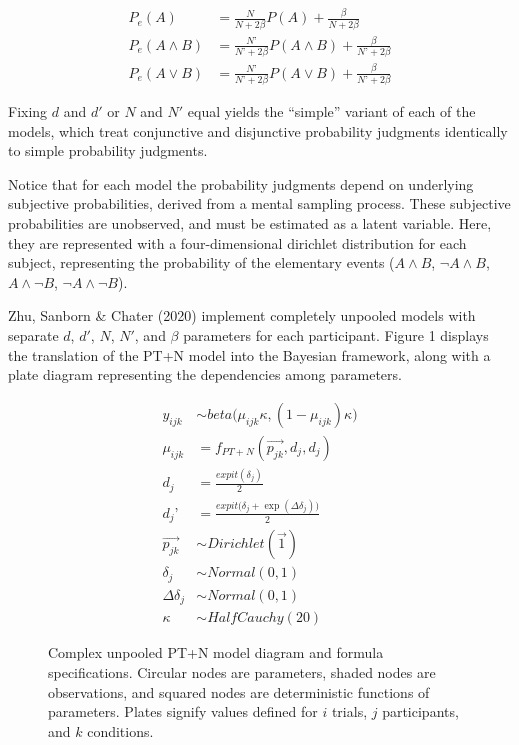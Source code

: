 \documentclass[
  english,
  man,floatsintext]{apa6}
\begin{document}
\begin{align*}
  P_{e}(A) &= \frac{N}{N + 2 \beta}P(A) + \frac{\beta}{N+2 \beta} \\
  P_{e}(A \land B) &= \frac{N’}{N’ + 2 \beta}P(A \land B) + \frac{\beta}{N’+2 \beta} \\
  P_{e}(A \lor B) &= \frac{N’}{N’ + 2 \beta}P(A \lor B) + \frac{\beta}{N’+2 \beta} 
\end{align*}

Fixing \(d\) and \(d'\) or \(N\) and \(N'\) equal yields the ``simple'' variant of each of the models, which treat conjunctive and disjunctive probability judgments identically to simple probability judgments.

Notice that for each model the probability judgments depend on underlying subjective probabilities, derived from a mental sampling process. These subjective probabilities are unobserved, and must be estimated as a latent variable. Here, they are represented with a four-dimensional dirichlet distribution for each subject, representing the probability of the elementary events (\(A \land B\), \(\neg A \land B\), \(A \land \neg B\), \(\neg A \land \neg B\)).

Zhu, Sanborn \& Chater (2020) implement completely unpooled models with separate \(d\), \(d'\), \(N\), \(N'\), and \(\beta\) parameters for each participant. Figure 1 displays the translation of the PT+N model into the Bayesian framework, along with a plate diagram representing the dependencies among parameters.

\begin{figure}
  \begin{minipage}{.5\textwidth}
    \flushright
    
  \end{minipage}%
  \begin{minipage}{.5\textwidth}
    \flushleft
    \small
    \begin{align*}
      y_{ijk} &\sim beta\big(\mu_{ijk} \kappa, (1-\mu_{ijk}) \kappa \big) \\
      \mu_{ijk} &= f_{PT+N}(\overrightarrow{p_{jk}}, d_j, d_j)  \\
      d_j &= \frac{expit(\delta_j)}{2} \\
      d_j’ &= \frac{expit\big(\delta_j + \exp(\Delta\delta_j)\big)}{2} \\
      \overrightarrow{p_{jk}} &\sim Dirichlet(\overrightarrow{1}) \\
      \delta_j &\sim Normal(0,1) \\
      \Delta\delta_j &\sim Normal(0,1) \\
      \kappa &\sim HalfCauchy(20)
    \end{align*}
  \end{minipage}
  \caption{Complex unpooled PT+N model diagram and formula specifications. Circular nodes are parameters, shaded nodes are observations, and squared nodes are deterministic functions of parameters. Plates signify values defined for $i$ trials, $j$ participants, and $k$ conditions.}
\end{figure}
\end{document}
